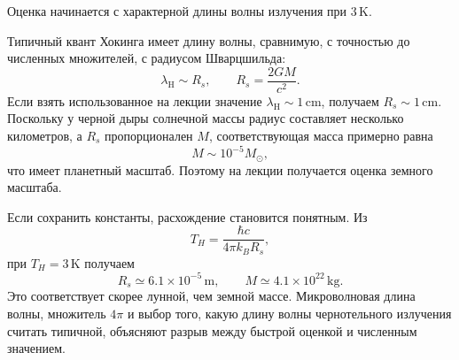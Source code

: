 Оценка начинается с характерной длины волны излучения при \(3\,\mathrm{K}\).

\begin{classroomqa}
\end{classroomqa}

Типичный квант Хокинга имеет длину волны, сравнимую, с точностью до численных множителей, с радиусом Шварцшильда:
\begin{equation}
\lambda_{\mathrm{H}}\sim R_s,
\qquad
R_s=\frac{2GM}{c^2}.
\label{eq:l05-scale}
\end{equation}
Если взять использованное на лекции значение \(\lambda_{\mathrm H}\sim1\,\mathrm{cm}\), получаем \(R_s\sim1\,\mathrm{cm}\). Поскольку у черной дыры солнечной массы радиус составляет несколько километров, а \(R_s\) пропорционален \(M\), соответствующая масса примерно равна
\begin{equation}
M\sim10^{-5}M_\odot,
\label{eq:l05-rough-mass}
\end{equation}
что имеет планетный масштаб. Поэтому на лекции получается оценка земного масштаба.

\begin{classroomqa}
\end{classroomqa}

Если сохранить константы, расхождение становится понятным. Из
\begin{equation}
T_H=\frac{\hbar c}{4\pi k_B R_s},
\end{equation}
при \(T_H=3\,\mathrm{K}\) получаем
\begin{equation}
R_s\simeq6.1\times10^{-5}\,\mathrm{m},
\qquad
M\simeq4.1\times10^{22}\,\mathrm{kg}.
\label{eq:l05-three-kelvin}
\end{equation}
Это соответствует скорее лунной, чем земной массе. Микроволновая длина волны, множитель \(4\pi\) и выбор того, какую длину волны чернотельного излучения считать типичной, объясняют разрыв между быстрой оценкой и численным значением.

